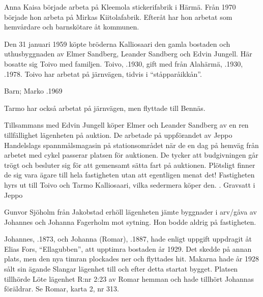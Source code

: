 Anna Kaisa började arbeta på Kleemola stickerifabrik i Härmä. Från 1970 började hon arbeta på Mirkas Kiitolafabrik. Efteråt har hon arbetat som hemvårdare och barnskötare åt kommunen.


%

%
Den 31 januari 1959 köpte bröderna Kalliosaari den gamla bostaden och uthusbyggnaden av Elmer Sandberg, Leander Sandberg och Edvin Jungell. Här bosatte sig Toivo med familjen. Toivo, .1930, gift med  från Alahärmä, .1930, .1978. Toivo har arbetat på järnvägen, tidvis i ``ståpparåikkån''.

Barn; Marko .1969

Tarmo har också arbetat på järnvägen, men flyttade till Bennäs.



%
Tillsammans med Edvin Jungell köper Elmer och Leander Sandberg av en ren tillfällighet lägenheten på auktion. De arbetade på uppförandet av Jeppo Handelslags spannmålsmagasin på stationsområdet när de en dag på hemväg från arbetet med cykel passerar platsen för auktionen. De tycker att budgivningen går trögt och besluter sig för att gemensamt sätta fart på auktionen. Plötsligt finner de sig vara ägare till hela fastigheten utan att egentligen menat det! Fastigheten hyrs ut till Toivo och Tarmo Kalliosaari, vilka sedermera köper den.
. Gravsatt i Jeppo


%
Gunvor Sjöholm från Jakobstad erhöll lägenheten jämte byggnader i arv/gåva av Johannes och Johanna Fagerholm mot sytning. Hon bodde aldrig på fastigheten.


%
Johannes, .1873, och Johanna (Romar), .1887, hade enligt uppgift uppdragit åt Elias Fors, ``Ellagubben'', att upptimra bostaden år 1929. Det skedde på annan plats, men den nya timran plockades ner och flyttades hit. Makarna hade år 1928 sålt sin ägande Slangar lägenhet till  och efter detta startat bygget. Platsen tillhörde Löte lägenhet R:nr 2:23 av Romar hemman och hade tillhört Johannas föräldrar. Se Romar, karta 2, nr 313.

